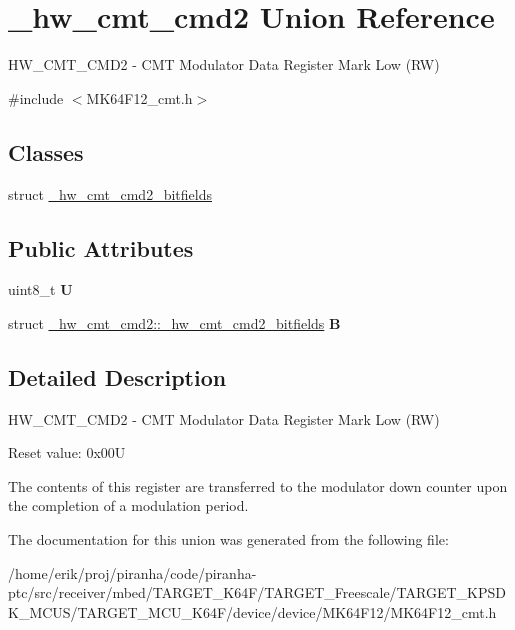 \hypertarget{union__hw__cmt__cmd2}{}\section{\+\_\+hw\+\_\+cmt\+\_\+cmd2 Union Reference}
\label{union__hw__cmt__cmd2}


H\+W\+\_\+\+C\+M\+T\+\_\+\+C\+M\+D2 -\/ C\+MT Modulator Data Register Mark Low (RW)  




{\ttfamily \#include $<$M\+K64\+F12\+\_\+cmt.\+h$>$}

\subsection*{Classes}
\begin{DoxyCompactItemize}
\item 
struct \hyperlink{struct__hw__cmt__cmd2_1_1__hw__cmt__cmd2__bitfields}{\+\_\+hw\+\_\+cmt\+\_\+cmd2\+\_\+bitfields}
\end{DoxyCompactItemize}
\subsection*{Public Attributes}
\begin{DoxyCompactItemize}
\item 
uint8\+\_\+t {\bfseries U}\hypertarget{union__hw__cmt__cmd2_afc53899f0fe112a18e4a1f0cf64737c3}{}\label{union__hw__cmt__cmd2_afc53899f0fe112a18e4a1f0cf64737c3}

\item 
struct \hyperlink{struct__hw__cmt__cmd2_1_1__hw__cmt__cmd2__bitfields}{\+\_\+hw\+\_\+cmt\+\_\+cmd2\+::\+\_\+hw\+\_\+cmt\+\_\+cmd2\+\_\+bitfields} {\bfseries B}\hypertarget{union__hw__cmt__cmd2_a2f16986915e1bc39cb9c897423c89582}{}\label{union__hw__cmt__cmd2_a2f16986915e1bc39cb9c897423c89582}

\end{DoxyCompactItemize}


\subsection{Detailed Description}
H\+W\+\_\+\+C\+M\+T\+\_\+\+C\+M\+D2 -\/ C\+MT Modulator Data Register Mark Low (RW) 

Reset value\+: 0x00U

The contents of this register are transferred to the modulator down counter upon the completion of a modulation period. 

The documentation for this union was generated from the following file\+:\begin{DoxyCompactItemize}
\item 
/home/erik/proj/piranha/code/piranha-\/ptc/src/receiver/mbed/\+T\+A\+R\+G\+E\+T\+\_\+\+K64\+F/\+T\+A\+R\+G\+E\+T\+\_\+\+Freescale/\+T\+A\+R\+G\+E\+T\+\_\+\+K\+P\+S\+D\+K\+\_\+\+M\+C\+U\+S/\+T\+A\+R\+G\+E\+T\+\_\+\+M\+C\+U\+\_\+\+K64\+F/device/device/\+M\+K64\+F12/M\+K64\+F12\+\_\+cmt.\+h\end{DoxyCompactItemize}
